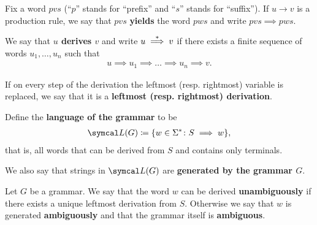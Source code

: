 \begin{definition}\label{def:grammar_derivation}\cite[104,108]{Sipser2013}
  Fix a word \( pvs \) (\enquote{\( p \)} stands for \enquote{prefix} and \enquote{\( s \)} stands for \enquote{suffix}). If \( u \to v \) is a production rule, we say that \( pvs \) \textbf{yields} the word \( pws \) and write \( pvs \implies pws \).

  We say that \textbf{\( u \) derives \( v \)} and write \( u \overset * \implies v \) if there exists a finite sequence of words \( u_1, \ldots, u_n \) such that
  \begin{align*}
    u \implies u_1 \implies \ldots \implies u_n \implies v.
  \end{align*}

  If on every step of the derivation the leftmost (resp. rightmost) variable is replaced, we say that it is a \textbf{leftmost (resp. rightmost) derivation}.

  Define the \textbf{language of the grammar} to be
  \begin{align*}
    \Cal{L}(G) \coloneqq \{ w \in \Sigma^* \colon S \implies w \},
  \end{align*}
  that is, all words that can be derived from \( S \) and contains only terminals.

  We also say that strings in \( \Cal{L}(G) \) are \textbf{generated by the grammar \( G \)}.
\end{definition}

\begin{definition}\label{def:ambiguous_grammar}\cite[definition 2.7]{Sipser2013}
  Let \( G \) be a grammar. We say that the word \( w \) can be derived \textbf{unambiguously} if there exists a unique leftmost derivation from \( S \). Otherwise we say that \( w \) is generated \textbf{ambiguously} and that the grammar itself is \textbf{ambiguous}.
\end{definition}

